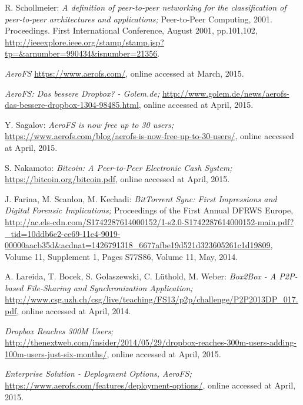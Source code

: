 \begin{thebibliography}{99}

		R. Schollmeier:
		\emph{A definition of peer-to-peer networking for the classification of peer-to-peer architectures and applications;}
		Peer-to-Peer Computing, 2001. Proceedings. First International Conference,
		August 2001,
		pp.101,102,
		\url{http://ieeexplore.ieee.org/stamp/stamp.jsp?tp=&arnumber=990434&isnumber=21356}.

		\emph{AeroFS}
		\url{https://www.aerofs.com/},
		online accessed at March, 2015.

		\emph{AeroFS: Das bessere Dropbox? - Golem.de;}
		\url{http://www.golem.de/news/aerofs-das-bessere-dropbox-1304-98485.html},
		online accessed at April, 2015.

		Y. Sagalov:
		\emph{AeroFS is now free up to 30 users;}
		\url{https://www.aerofs.com/blog/aerofs-is-now-free-up-to-30-users/},
		online accessed at April, 2015.
		
		S. Nakamoto:
		\emph{Bitcoin: A Peer-to-Peer Electronic Cash System;}
		\url{https://bitcoin.org/bitcoin.pdf},
		online accessed at April, 2015.

		J. Farina, M. Scanlon, M. Kechadi:
		\emph{BitTorrent Sync: First Impressions and Digital Forensic Implications;}
		Proceedings of the First Annual DFRWS Europe,
		\url{http://ac.els-cdn.com/S1742287614000152/1-s2.0-S1742287614000152-main.pdf?_tid=10ddb6e2-ce69-11e4-9019-00000aacb35d&acdnat=1426791318_6677afbe19d521d323605261c1d19809},
		Volume 11, Supplement 1, Pages S77\textendash S86, Volume 11, May, 2014.

		A. Lareida, T. Bocek, S. Golaszewski, C. L\"uthold, M. Weber:
		\emph{Box2Box - A P2P-based File-Sharing and Synchronization Application;}
		\url{http://www.csg.uzh.ch/csg/live/teaching/FS13/p2p/challenge/P2P2013DP_017.pdf},
		online accessed at April, 2014.

		\emph{Dropbox Reaches 300M Users;}
		\url{http://thenextweb.com/insider/2014/05/29/dropbox-reaches-300m-users-adding-100m-users-just-six-months/},
		online accessed at April, 2015.

		\emph{Enterprise Solution - Deployment Options, AeroFS;}
		\url{https://www.aerofs.com/features/deployment-options/},
		online accessed at April, 2015.


\end{thebibliography}
